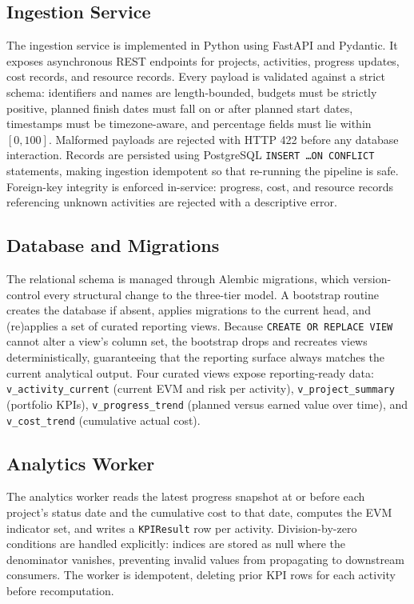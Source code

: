 \documentclass[conference]{IEEEtran}
\begin{document}
\subsection{Ingestion Service}

The ingestion service is implemented in Python using FastAPI and Pydantic. It exposes asynchronous REST endpoints for projects, activities, progress updates, cost records, and resource records. Every payload is validated against a strict schema: identifiers and names are length-bounded, budgets must be strictly positive, planned finish dates must fall on or after planned start dates, timestamps must be timezone-aware, and percentage fields must lie within \([0, 100]\). Malformed payloads are rejected with HTTP 422 before any database interaction. Records are persisted using PostgreSQL \texttt{INSERT \ldots ON CONFLICT} statements, making ingestion idempotent so that re-running the pipeline is safe. Foreign-key integrity is enforced in-service: progress, cost, and resource records referencing unknown activities are rejected with a descriptive error.

\subsection{Database and Migrations}

The relational schema is managed through Alembic migrations, which version-control every structural change to the three-tier model. A bootstrap routine creates the database if absent, applies migrations to the current head, and (re)applies a set of curated reporting views. Because \texttt{CREATE OR REPLACE VIEW} cannot alter a view's column set, the bootstrap drops and recreates views deterministically, guaranteeing that the reporting surface always matches the current analytical output. Four curated views expose reporting-ready data: \texttt{v\_activity\_current} (current EVM and risk per activity), \texttt{v\_project\_summary} (portfolio KPIs), \texttt{v\_progress\_trend} (planned versus earned value over time), and \texttt{v\_cost\_trend} (cumulative actual cost).

\subsection{Analytics Worker}

The analytics worker reads the latest progress snapshot at or before each project's status date and the cumulative cost to that date, computes the EVM indicator set, and writes a \texttt{KPIResult} row per activity. Division-by-zero conditions are handled explicitly: indices are stored as null where the denominator vanishes, preventing invalid values from propagating to downstream consumers. The worker is idempotent, deleting prior KPI rows for each activity before recomputation.
\end{document}
